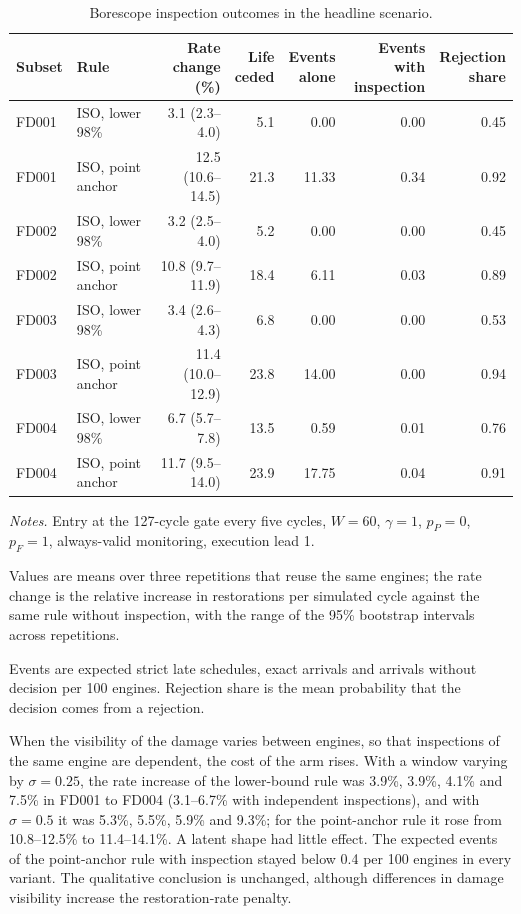 \documentclass[preprint,12pt]{elsarticle}
\newcommand{\tablenotes}[1]{\par\smallskip\begin{minipage}{\linewidth}\footnotesize\raggedright\setlength{\parindent}{0pt}\setlength{\parskip}{0.35\baselineskip}\textit{Notes.} #1\end{minipage}}
\begin{document}
\begin{table}[htbp]
\centering
\caption{Borescope inspection outcomes in the headline scenario.}
\label{tab:inspection}
\footnotesize
\setlength{\tabcolsep}{3pt}
\begin{tabularx}{\linewidth}{@{}lXrrrrr@{}}
\toprule
Subset & Rule & \shortstack{Rate change\\(\%)} & \shortstack{Life\\ceded} & \shortstack{Events\\alone} & \shortstack{Events with\\inspection} & \shortstack{Rejection\\share} \\
\midrule
FD001 & ISO, lower 98\% & 3.1 (2.3--4.0) & 5.1 & 0.00 & 0.00 & 0.45 \\
FD001 & ISO, point anchor & 12.5 (10.6--14.5) & 21.3 & 11.33 & 0.34 & 0.92 \\
FD002 & ISO, lower 98\% & 3.2 (2.5--4.0) & 5.2 & 0.00 & 0.00 & 0.45 \\
FD002 & ISO, point anchor & 10.8 (9.7--11.9) & 18.4 & 6.11 & 0.03 & 0.89 \\
FD003 & ISO, lower 98\% & 3.4 (2.6--4.3) & 6.8 & 0.00 & 0.00 & 0.53 \\
FD003 & ISO, point anchor & 11.4 (10.0--12.9) & 23.8 & 14.00 & 0.00 & 0.94 \\
FD004 & ISO, lower 98\% & 6.7 (5.7--7.8) & 13.5 & 0.59 & 0.01 & 0.76 \\
FD004 & ISO, point anchor & 11.7 (9.5--14.0) & 23.9 & 17.75 & 0.04 & 0.91 \\
\bottomrule
\end{tabularx}
\tablenotes{Entry at the 127-cycle gate every five cycles, $W=60$, $\gamma=1$, $p_P=0$, $p_F=1$, always-valid monitoring, execution lead 1.

Values are means over three repetitions that reuse the same engines; the rate change is the relative increase in restorations per simulated cycle against the same rule without inspection, with the range of the 95\% bootstrap intervals across repetitions.

Events are expected strict late schedules, exact arrivals and arrivals without decision per 100 engines. Rejection share is the mean probability that the decision comes from a rejection.}
\end{table}

When the visibility of the damage varies between engines, so that inspections of the same engine are dependent, the cost of the arm rises. With a window varying by $\sigma=0.25$, the rate increase of the lower-bound rule was 3.9\%, 3.9\%, 4.1\% and 7.5\% in FD001 to FD004 (3.1--6.7\% with independent inspections), and with $\sigma=0.5$ it was 5.3\%, 5.5\%, 5.9\% and 9.3\%; for the point-anchor rule it rose from 10.8--12.5\% to 11.4--14.1\%. A latent shape had little effect. The expected events of the point-anchor rule with inspection stayed below 0.4 per 100 engines in every variant. The qualitative conclusion is unchanged, although differences in damage visibility increase the restoration-rate penalty.
\end{document}
